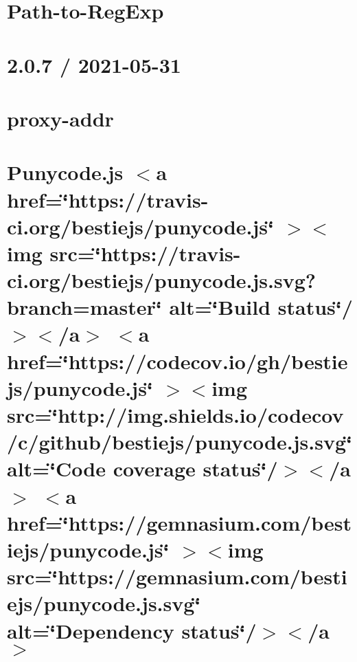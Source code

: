 \documentclass[twoside]{book}
\newcommand{\+}{\discretionary{\mbox{\scriptsize$\hookleftarrow$}}{}{}}
\begin{document}
\chapter{Path-\/to-\/\+Reg\+Exp}
\label{md__c___users_vaishnavi_jadhav__desktop__developer_code_mean_stack_example_server_node_modules_path_to_regexp__readme}

\chapter{2.0.7 / 2021-\/05-\/31}
\label{md__c___users_vaishnavi_jadhav__desktop__developer_code_mean_stack_example_server_node_modules_proxy_addr__h_i_s_t_o_r_y}

\chapter{proxy-\/addr}
\label{md__c___users_vaishnavi_jadhav__desktop__developer_code_mean_stack_example_server_node_modules_proxy_addr__r_e_a_d_m_e}

\chapter{Punycode.\+js \texorpdfstring{$<$}{<}a href=\char`\"{}https\+://travis-\/ci.\+org/bestiejs/punycode.\+js\char`\"{} \texorpdfstring{$>$}{>}\texorpdfstring{$<$}{<}img src=\char`\"{}https\+://travis-\/ci.\+org/bestiejs/punycode.\+js.\+svg?branch=master\char`\"{} alt=\char`\"{}\+Build status\char`\"{}/\texorpdfstring{$>$}{>}\texorpdfstring{$<$}{<}/a\texorpdfstring{$>$}{>} \texorpdfstring{$<$}{<}a href=\char`\"{}https\+://codecov.\+io/gh/bestiejs/punycode.\+js\char`\"{} \texorpdfstring{$>$}{>}\texorpdfstring{$<$}{<}img src=\char`\"{}http\+://img.\+shields.\+io/codecov/c/github/bestiejs/punycode.\+js.\+svg\char`\"{} alt=\char`\"{}\+Code coverage status\char`\"{}/\texorpdfstring{$>$}{>}\texorpdfstring{$<$}{<}/a\texorpdfstring{$>$}{>} \texorpdfstring{$<$}{<}a href=\char`\"{}https\+://gemnasium.\+com/bestiejs/punycode.\+js\char`\"{} \texorpdfstring{$>$}{>}\texorpdfstring{$<$}{<}img src=\char`\"{}https\+://gemnasium.\+com/bestiejs/punycode.\+js.\+svg\char`\"{} alt=\char`\"{}\+Dependency status\char`\"{}/\texorpdfstring{$>$}{>}\texorpdfstring{$<$}{<}/a\texorpdfstring{$>$}{>}}
\label{md__c___users_vaishnavi_jadhav__desktop__developer_code_mean_stack_example_server_node_modules_punycode__r_e_a_d_m_e}

\end{document}
